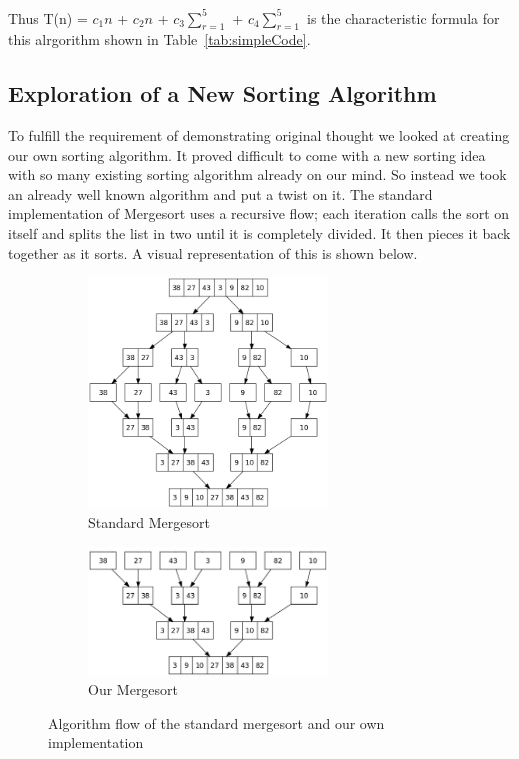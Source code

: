 \documentclass[12pt]{article}
\begin{document}
	
	Thus T(n) = $c_1n$ + $c_2n$ + $c_3\sum_{r=1}^{5}$ + $c_4\sum_{r=1}^{5}$ is the characteristic formula for this alrgorithm shown in Table~\ref{tab:simpleCode}.
	
	\subsection{Exploration of a New Sorting Algorithm}
	
	
	To fulfill the requirement of demonstrating original thought we looked at creating our own sorting algorithm.
	 It proved difficult to come with a new sorting idea with so many existing sorting algorithm already on our mind.
	So instead we took an already well known algorithm and put a twist on it. 
	The standard implementation of Mergesort uses a recursive flow; each iteration calls the sort on itself and splits the list in two until it is completely divided. 
	It then pieces it back together as it sorts. 
	A visual representation of this is shown below.
	
	
\begin{figure}[H]
	
	\begin{subfigure}{0.5\textwidth}
		\includegraphics[width=2.5in]{Merge_sort_algorithm_diagram.png} 
		\caption{Standard Mergesort}
		\label{fig:stdmerge}
	\end{subfigure}
	\begin{subfigure}{0.5\textwidth}
		\includegraphics[width=2.5in]{New_merge_sort_algorithm_diagram.png}
		\caption{Our Mergesort}
		\label{fig:newmerge}
	\end{subfigure}
	
	\caption{Algorithm flow of the standard mergesort and our own implementation}
	\label{fig:bothmerge}
\end{figure}
	
\end{document}
